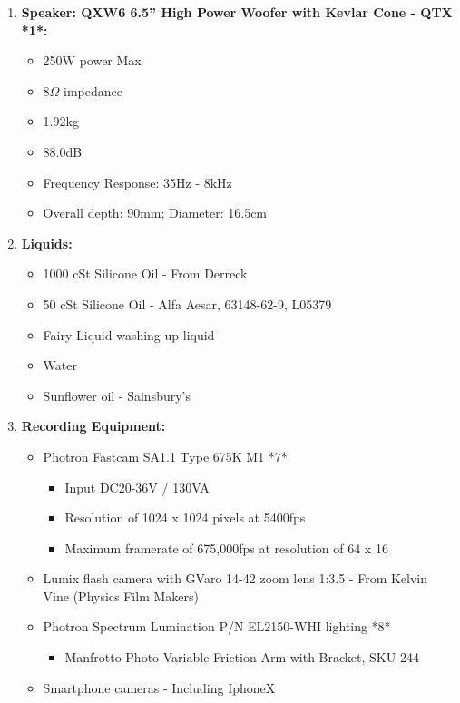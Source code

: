 \begin{enumerate}

\item \textbf{Speaker: QXW6 6.5'' High Power Woofer with Kevlar Cone - QTX *1*:}

\begin{itemize}
\item 250W power Max
\item 8$\Omega$ impedance
\item 1.92kg
\item 88.0dB
\item Frequency Response: 35Hz - 8kHz
\item Overall depth: 90mm; Diameter: 16.5cm
\end{itemize}
\item \textbf{Liquids:}

\begin{itemize}
\item 1000 cSt Silicone Oil - From Derreck
\item 50 cSt Silicone Oil - Alfa Aesar, 63148-62-9, L05379
\item Fairy Liquid washing up liquid
\item Water
\item Sunflower oil - Sainsbury's
\end{itemize}
\item \textbf{Recording Equipment:}

\begin{itemize}
\item Photron Fastcam SA1.1 Type 675K M1 *7*

\begin{itemize}
\item Input DC20-36V / 130VA
\item Resolution of 1024 x 1024 pixels at 5400fps
\item Maximum framerate of 675,000fps at resolution of 64 x 16
\end{itemize}
\item Lumix flash camera with GVaro 14-42 zoom lens 1:3.5 - From Kelvin Vine (Physics Film Makers)
\item Photron Spectrum Lumination P/N EL2150-WHI lighting *8*

\begin{itemize}
\item Manfrotto Photo Variable Friction Arm with Bracket, SKU 244
\end{itemize}
\item Smartphone cameras - Including IphoneX


\end{itemize}
\end{enumerate}
